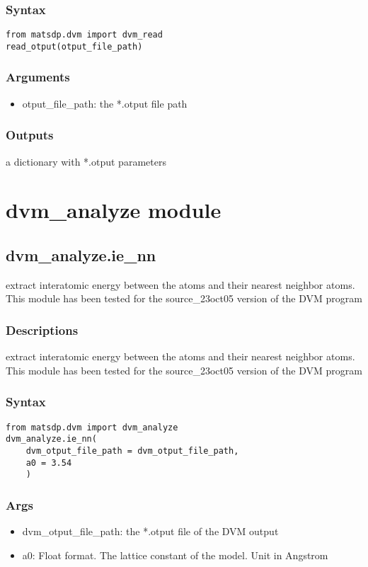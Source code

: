 \documentclass[12pt]{book}
\begin{document}
\subsubsection{Syntax}
\begin{lstlisting}
from matsdp.dvm import dvm_read
read_otput(otput_file_path)
\end{lstlisting}

\subsubsection{Arguments}
\begin{itemize}
\item otput\_file\_path: the *.otput file path
\end{itemize}

\subsubsection{Outputs}
a dictionary with *.otput parameters

\section{dvm\_analyze module}

\subsection{dvm\_analyze.ie\_nn}
extract interatomic energy between the atoms and their nearest neighbor atoms. This module has been tested for the source\_23oct05 version of the DVM program

\subsubsection{Descriptions}
extract interatomic energy between the atoms and their nearest neighbor atoms. This module has been tested for the source\_23oct05 version of the DVM program

\subsubsection{Syntax}
\begin{lstlisting}
from matsdp.dvm import dvm_analyze
dvm_analyze.ie_nn(
    dvm_otput_file_path = dvm_otput_file_path,
    a0 = 3.54
    )
\end{lstlisting}
\subsubsection{Args}
\begin{itemize}
\item dvm\_otput\_file\_path: the *.otput file of the DVM output
\item a0: Float format. The lattice constant of the model. Unit in Angstrom
\end{itemize}
\end{document}
